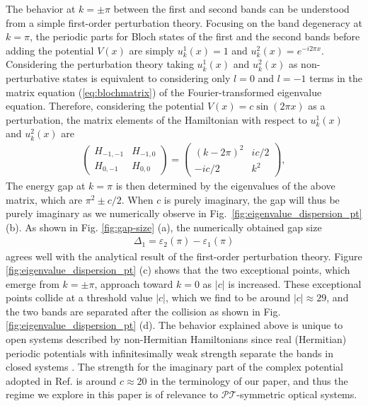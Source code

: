 \documentclass[prb,superscriptaddress,floatfix,twocolumn,showpacs]{revtex4-2}
\begin{document}
The behavior at $k = \pm \pi$ between the first and second bands can be understood from a simple first-order perturbation theory. Focusing on the band degeneracy at $k = \pi$, the periodic parts for Bloch states of the first and the second bands before adding the potential $V(x)$ are simply $u^1_{k}(x) = 1$ and $u^2_{k}(x) = e^{-i2\pi x}$.
Considering the perturbation theory taking $u^1_{k}(x)$ and $u^2_{k}(x)$ as non-perturbative states is equivalent to considering only $l = 0$ and $l=-1$ terms in the matrix equation (\ref{eq:blochmatrix}) of the Fourier-transformed eigenvalue equation. 
Therefore, considering the potential $V(x) = c \sin (2\pi x)$ as a perturbation, the matrix elements of the Hamiltonian with respect to $u^1_{k}(x)$ and $u^2_{k}(x)$ are
\begin{align}
    \begin{pmatrix}
    H_{-1,-1} &
    H_{-1,0} \\
    H_{0,-1} &
    H_{0,0}
    \end{pmatrix}
    =
    \begin{pmatrix}
    (k-2\pi)^2 & ic/2 \\
    -ic/2 & k^2
    \end{pmatrix},
    \label{eq:firstgap}
\end{align}
The energy gap at $k = \pi$ is then determined by the eigenvalues of the above matrix, which are $\pi^2 \pm c/2$. When $c$ is purely imaginary, the gap will thus be purely imaginary as we numerically observe in Fig.~\ref{fig:eigenvalue_dispersion_pt} (b). 
As shown in Fig. \ref{fig:gap-size} (a), the numerically obtained gap size
\begin{align}
    \Delta_1=\varepsilon_2(\pi)-\varepsilon_1(\pi)
    \label{eq:gap-size_1}
\end{align}
agrees well with the analytical result of the first-order perturbation theory. 
Figure \ref{fig:eigenvalue_dispersion_pt} (c) shows that the two exceptional points, which emerge from $k = \pm \pi$, approach toward $k = 0$ as $|c|$ is increased. 
These exceptional points collide at a threshold value $|c|$, which we find to be around $|c| \approx 29$, and the two bands are separated after the collision as shown in Fig. \ref{fig:eigenvalue_dispersion_pt} (d). 
The behavior explained above is unique to open systems described by non-Hermitian Hamiltonians since real (Hermitian) periodic potentials with infinitesimally weak strength separate the bands in closed systems \cite{ashcroft1976solid}. 
The strength for the imaginary part of the complex potential adopted in Ref. \cite{makris2008beam} is around $c \approx 20$ in the terminology of our paper, and thus the regime we explore in this paper is of relevance to $\mathcal{PT}$-symmetric optical systems.
\end{document}
